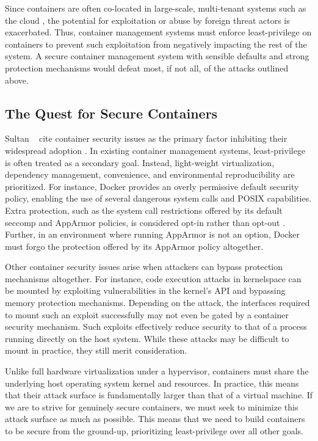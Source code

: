 Since containers are often co-located in large-scale, multi-tenant systems such as the cloud \cite{sultan2019_container_security}, the potential for exploitation or abuse by foreign threat actors is exacerbated. Thus, container management systems must enforce least-privilege on containers to prevent such exploitation from negatively impacting the rest of the system. A secure container management system with sensible defaults and strong protection mechanisms would defeat most, if not all, of the attacks outlined above.

\subsection{The Quest for Secure Containers}%
\label{sub:secure_containers}

Sultan \etal~ cite container security issues as the primary factor inhibiting their widespread adoption \cite{sultan2019_container_security}. In existing container management systems, least-privilege is often treated as a secondary goal. Instead, light-weight virtualization, dependency management, convenience, and environmental reproducibility are prioritized. For instance, Docker \cite{docker,sultan2019_container_security} provides an overly permissive default security policy, enabling the use of several dangerous system calls and POSIX capabilities. Extra protection, such as the system call restrictions offered by its default seccomp and AppArmor policies, is considered opt-in rather than opt-out \cite{docker,sultan2019_container_security}. Further, in an environment where running AppArmor is not an option, Docker must forgo the protection offered by its AppArmor policy altogether.

Other container security issues arise when attackers can bypass protection mechanisms altogether. For instance, code execution attacks in kernelspace can be mounted by exploiting vulnerabilities in the kernel's API and bypassing memory protection mechanisms. Depending on the attack, the interfaces required to mount such an exploit successfully may not even be gated by a container security mechanism. Such exploits effectively reduce security to that of a process running directly on the host system. While these attacks may be difficult to mount in practice, they still merit consideration.

Unlike full hardware virtualization under a hypervisor, containers must share the underlying host operating system kernel and resources. In practice, this means that their attack surface is fundamentally larger than that of a virtual machine. If we are to strive for genuinely secure containers, we must seek to minimize this attack surface as much as possible. This means that we need to build containers to be secure from the ground-up, prioritizing least-privilege over all other goals.
